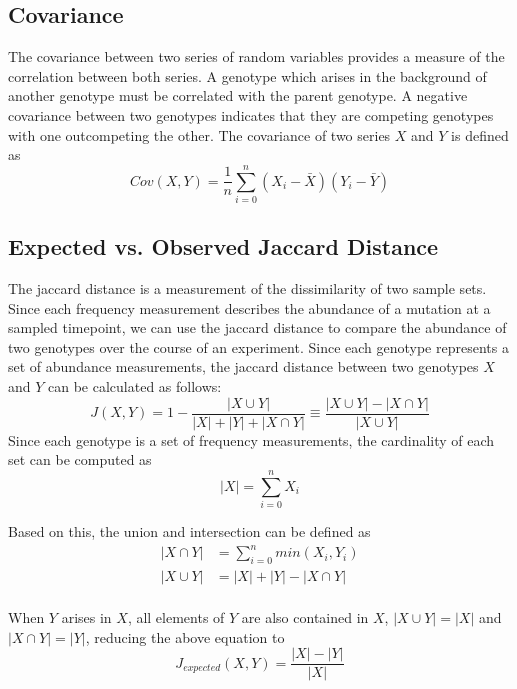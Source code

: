 \documentclass{book}
\begin{document}
\subsection{Covariance}
The covariance between two series of random variables provides a measure of the correlation between both series. 
A genotype which arises in the background of another genotype must be correlated with the parent genotype.
A negative covariance between two genotypes indicates that they are competing genotypes with one outcompeting the other.
The covariance of two series $X$ and $Y$ is defined as
\begin{equation}
Cov(X,Y) = \frac{1}{n}\sum_{i=0}^n (X_i-\bar{X})(Y_i-\bar{Y})
\end{equation}


\subsection{Expected vs. Observed Jaccard Distance}

The jaccard distance is a measurement of the dissimilarity of two sample sets. 
Since each frequency measurement describes the abundance of a mutation at a sampled timepoint, 
we can use the jaccard distance to compare the abundance of two genotypes over the course of an experiment.
Since each genotype represents a set of abundance measurements, the jaccard distance between two genotypes $X$ and $Y$ can be calculated as follows:
\begin{equation}
J(X,Y)=1 - \frac{|X\cup Y|}{|X|+|Y|+|X \cap Y|}\equiv \frac{|X\cup Y|-|X \cap Y|}{|X \cup Y|}
\end{equation}
Since each genotype is a set of frequency measurements, the cardinality of each set can be computed as
\begin{equation}
|X| = \sum_{i=0}^n X_i
\end{equation}


Based on this, the union and intersection can be defined as
\begin{align*}
|X \cap Y| &= \sum_{i=0}^n min(X_i,Y_i) \\
|X \cup Y| &= |X| + |Y| - |X \cap Y| \\
\end{align*}


When $Y$ arises in $X$, all elements of $Y$ are also contained in $X$, $|X \cup Y| = |X|$ and $|X \cap Y| = |Y|$, reducing the above equation to
\begin{equation}
J_{expected}(X,Y) = \frac{|X|-|Y|}{|X|}
\end{equation}
\end{document}
